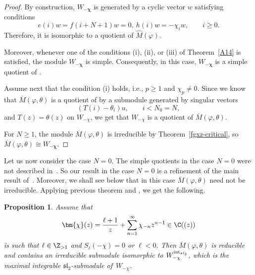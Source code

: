 \documentclass[10pt,a4paper]{amsart}
\numberwithin{equation}{section}
\newtheorem{Proposition}[Theorem]{Proposition}
\theoremstyle{definition}
\newcommand{\1}{\textbf{1}}
\begin{document}
 \begin{proof}
By construction, $W_{-\bm{\chi}}$ is generated by a cyclic vector $w$ satisfying conditions
 \[ e(i) w = f(i+ N+1) w =0, \ h(i) w = -\chi _i w, \qquad i\ge 0. \]
Therefore, it is isomorphic to a quotient of $\widehat M( \varphi)$.

Moreover, whenever one of the conditions \textnormal{(i)}, \textnormal{(ii)}, or \textnormal{(iii)} of Theorem~\ref{A14} is satisfied, the module $W_{-\boldsymbol{\chi}}$ is simple. Consequently, in this case, $W_{-\boldsymbol{\chi}}$ is a simple quotient of .

Assume next that the condition (i) holds, i.e., $p \ge 1$ and $\chi_p \ne 0$. Since we know that $\overline M(\varphi, \theta)$ is a quotient of  by a submodule generated by singular vectors
 \[ (T(i) - \theta_i) u, \qquad i < N_0 = N, \]
and $T(z) = \theta(z)$ on $W_{-\chi}$, we get that $W_{-\chi}$ is a quotient of $\overline M(\varphi, \theta)$.


For $N\ge 1$, the module $\overline M(\varphi, \theta)$ is irreducible by Theorem~\ref{fgxz-critical}, so $\overline M(\varphi, \theta) \cong W_{-\bm{\chi}}$.
 \end{proof}

Let us now consider the case $N=0$. The simple quotients in the case $N=0$ were not described in~\cite{FGXZ}. So our result in the case $N=0$ is a refinement of the main result of~\cite{FGXZ}.
Moreover, we shall see below that in this case $\overline M(\varphi, \theta)$ need not be irreducible.
 Applying previous theorem and \cite[Corollary 5.2 and Remark 5.1]{A-14}, we get the following.

\begin{Proposition} \label{reducibilni}
 Assume that \[ \bm{\chi}(z) = \frac{\ell +1}{z} + \sum_{n=1} ^{\infty} {\chi}_{-n} z ^{n-1} \in
{\C}((z))\]
is such that
 $\ell \in {\Z}_{>1} $ and $S_{\ell}(-\chi) =0 $ or $\ell <0$.
Then $\overline M(\varphi, \theta)$ is reducible and contains an irreducible submodule isomorphic to $W_{-\chi} ^{{\rm int}_{\mathfrak{sl}_2}}$, which is the maximal integrable $\mathfrak{sl}_2$-submodule of~$W_{-\chi}$.
 \end{Proposition}
\end{document}
